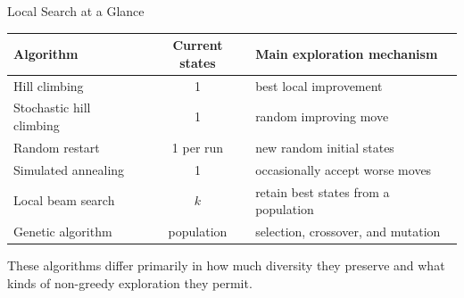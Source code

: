 \documentclass[aspectratio=169,10pt]{beamer}
\begin{document}
\begin{frame}[shrink=20]{Local Search at a Glance}
  \begin{center}
  \renewcommand{\arraystretch}{1.30}
  \begin{tabular}{l|c|l}
    \textbf{Algorithm} & \textbf{Current states} & \textbf{Main exploration mechanism} \\\hline
    Hill climbing & 1 & best local improvement \\
    Stochastic hill climbing & 1 & random improving move \\
    Random restart & 1 per run & new random initial states \\
    Simulated annealing & 1 & occasionally accept worse moves \\
    Local beam search & $k$ & retain best states from a population \\
    Genetic algorithm & population & selection, crossover, and mutation
  \end{tabular}
  \end{center}

  \begin{keyidea}
    These algorithms differ primarily in how much diversity they preserve and what kinds of non-greedy exploration they permit.
  \end{keyidea}
\end{frame}
\end{document}
